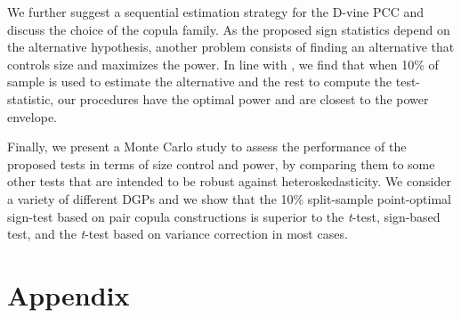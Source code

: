 \documentclass[harvard,11pt]{article}
\begin{document}
We further suggest a sequential estimation strategy for the D-vine PCC and discuss the choice of the copula family. As the proposed sign statistics depend on the alternative hypothesis, another problem consists of finding an alternative that controls size and maximizes the power. In line with \citet{dufour2010exact}, we find that when 10\% of sample is used to estimate the alternative and the rest to compute the test-statistic, our procedures have the optimal power and are closest to the power envelope.

Finally, we present a Monte Carlo study to assess the performance of the proposed tests in terms of size control and power, by comparing them to some other tests that are intended to be robust against heteroskedasticity. We consider a variety of different DGPs and we show that the 10\% split-sample point-optimal sign-test based on pair copula constructions is superior to the \textit{t}-test, \citet{dufour1995exact} sign-based test, and the \textit{t}-test based on \citet{white1980heteroskedasticity} variance correction in most cases.
\newpage

\section{Appendix}
\end{document}
